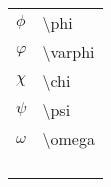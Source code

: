 \documentclass[14pt,a4paper]{extarticle}
\begin{document}
\begin{table}
\begin{subtable}{.24\textwidth}
\begin{tabular}{ p{1em} p{9em}  }
    \end{tabular}
  \end{subtable}
  \begin{subtable}{.24\textwidth}
    \begin{tabular}{ p{1em} p{9em}  }

      $\phi$ & \textbackslash phi \\
      $\varphi$ & \textbackslash varphi \\
      $\chi$ & \textbackslash chi \\
      $\psi$ & \textbackslash psi \\
      $\omega$ & \textbackslash omega \\
      \\ \\ \\ \\

    \end{tabular}
  \end{subtable}

\end{table}
\end{document}
